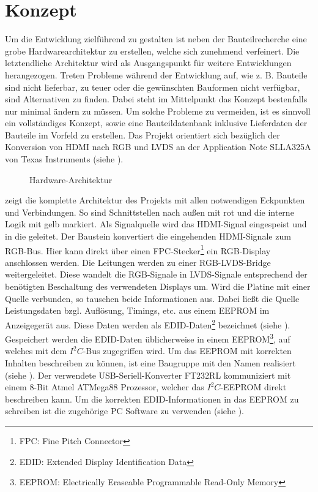 \section{Konzept}
\label{sec:TeilB_Konzept}
Um die Entwicklung zielführend zu gestalten ist neben der Bauteilrecherche eine grobe Hardwarearchitektur zu erstellen, welche sich zunehmend verfeinert. Die letztendliche Architektur wird als Ausgangspunkt für weitere Entwicklungen herangezogen. Treten Probleme während der Entwicklung auf, wie z. B. Bauteile sind nicht lieferbar, zu teuer oder die gewünschten Bauformen nicht verfügbar, sind Alternativen zu finden. Dabei steht im Mittelpunkt das Konzept bestenfalls nur minimal ändern zu müssen. Um solche Probleme zu vermeiden, ist es sinnvoll ein vollständiges Konzept, sowie eine Bauteildatenbank inklusive Lieferdaten der Bauteile im Vorfeld zu erstellen. Das Projekt orientiert sich bezüglich der Konversion von HDMI nach RGB und LVDS an der Application Note SLLA325A von Texas Instruments (siehe \cite{TI2011}).
\begin{figure}[htp]
	\centering
{}
	\caption{Hardware-Architektur}
	\label{fig:teilb_architektur}
\end{figure}

 zeigt die komplette Architektur des Projekts mit allen notwendigen Eckpunkten und Verbindungen. So sind Schnittstellen nach außen mit rot und die interne Logik mit gelb markiert. Als Signalquelle wird das HDMI-Signal eingespeist und in die  geleitet. Der Baustein  konvertiert die eingehenden HDMI-Signale zum RGB-Bus. Hier kann direkt über einen FPC-Stecker\footnote{FPC: Fine Pitch Connector} ein RGB-Display anschlossen werden. Die Leitungen werden zu einer RGB-LVDS-Bridge weitergeleitet. Diese wandelt die RGB-Signale in LVDS-Signale entsprechend der benötigten Beschaltung des verwendeten Displays um. Wird die Platine mit einer Quelle verbunden, so tauschen beide Informationen aus. Dabei ließt die Quelle Leistungsdaten bzgl. Auflösung, Timings, etc. aus einem EEPROM  im Anzeigegerät aus. Diese Daten werden als EDID-Daten\footnote{EDID: Extended Display Identification Data} bezeichnet (siehe \cite{edid2000}). Gespeichert werden die EDID-Daten üblicherweise in einem EEPROM\footnote{EEPROM: Electrically Eraseable Programmable Read-Only Memory}, auf welches mit dem $I^2C$-Bus zugegriffen wird. Um das EEPROM mit korrekten Inhalten beschreiben zu können, ist eine Baugruppe mit den Namen  realisiert (siehe ). Der verwendete USB-Seriell-Konverter FT232RL kommuniziert mit einem 8-Bit Atmel ATMega88 Prozessor, welcher das $I^2C$-EEPROM direkt beschreiben kann. Um die korrekten EDID-Informationen in das EEPROM zu schreiben ist die zugehörige PC Software zu verwenden (siehe ).\newpage
